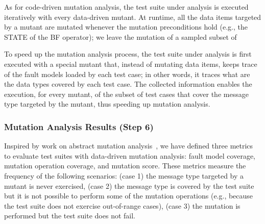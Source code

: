 As for code-driven mutation analysis, the test suite under analysis is executed iteratively with every data-driven mutant. 
At runtime, all the data items targeted by a mutant are mutated whenever the mutation preconditions hold (e.g., the STATE of the BF operator); we leave the mutation of a sampled subset of 

To speed up the mutation analysis process, the test suite under analysis is first executed with a special mutant that, instead of mutating data items, keeps trace of the fault models loaded by each test case; in other words, it traces what are the data types covered by each test case. The collected information enables the execution, for every mutant, of the subset of test cases that cover the 
message type
targeted by the mutant, thus speeding up mutation analysis.


\subsubsection{Mutation Analysis Results (Step 6)}
\label{sec:mutationAnalysisResults}

Inspired by work on abstract mutation analysis~\cite{Offutt2006}, we have defined three metrics to evaluate test suites with data-driven mutation analysis: fault model coverage, mutation operation coverage, and mutation score. 
These metrics measure the frequency of the following scenarios: (case 1) the message type targeted by a mutant is never exercised, (case 2) the message type is covered by the test suite but it is not possible to perform some of the mutation operations (e.g., because the test suite does not exercise out-of-range cases), (case 3) the mutation is performed but the test suite does not fail.

